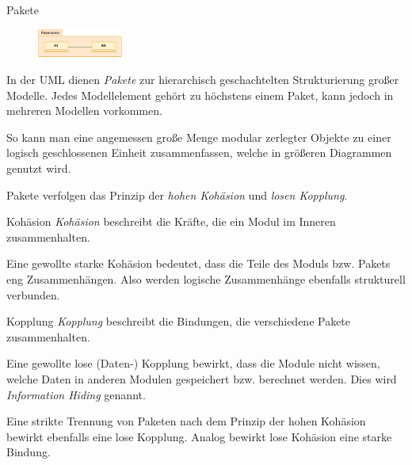 \begin{diag}{Pakete}
    \begin{figure}
        \centering
        \includegraphics[width=0.25\textwidth]{includes/figures/defi_diagrams_class_package.pdf}
    \end{figure}
    In der UML dienen \emph{Pakete} zur hierarchisch geschachtelten Strukturierung großer Modelle.
    Jedes Modellelement gehört zu höchstens einem Paket, kann jedoch in mehreren Modellen vorkommen.

    So kann man eine angemessen große Menge modular zerlegter Objekte zu einer logisch geschlossenen Einheit zusammenfassen, welche in größeren Diagrammen genutzt wird.

    Pakete verfolgen das Prinzip der \emph{hohen Kohäsion} und \emph{losen Kopplung}.
\end{diag}

\begin{defi}{Kohäsion}
    \emph{Kohäsion} beschreibt die Kräfte, die ein Modul im Inneren zusammenhalten.

    Eine gewollte starke Kohäsion bedeutet, dass die Teile des Moduls bzw. Pakets eng Zusammenhängen.
    Also werden logische Zusammenhänge ebenfalls strukturell verbunden.
\end{defi}

\begin{defi}{Kopplung}
    \emph{Kopplung} beschreibt die Bindungen, die verschiedene Pakete zusammenhalten.

    Eine gewollte lose (Daten-) Kopplung bewirkt, dass die Module nicht wissen, welche Daten in anderen Modulen gespeichert bzw. berechnet werden.
    Dies wird \emph{Information Hiding} genannt.

    Eine strikte Trennung von Paketen nach dem Prinzip der hohen Kohäsion bewirkt ebenfalls eine lose Kopplung.
    Analog bewirkt lose Kohäsion eine starke Bindung.
\end{defi}

